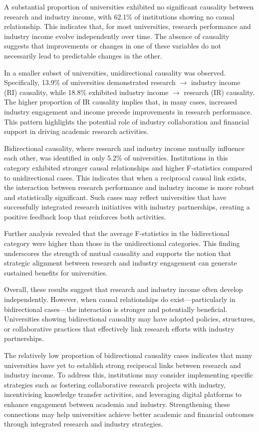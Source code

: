 \documentclass[a4paper, conference]{IEEEtran}
\begin{document}
A substantial proportion of universities exhibited no significant causality between research and industry income, with 62.1\% of institutions showing no causal relationship. This indicates that, for most universities, research performance and industry income evolve independently over time. The absence of causality suggests that improvements or changes in one of these variables do not necessarily lead to predictable changes in the other.

In a smaller subset of universities, unidirectional causality was observed. Specifically, 13.9\% of universities demonstrated research $\rightarrow$ industry income (RI) causality, while 18.8\% exhibited industry income $\rightarrow$ research (IR) causality. The higher proportion of IR causality implies that, in many cases, increased industry engagement and income precede improvements in research performance. This pattern highlights the potential role of industry collaboration and financial support in driving academic research activities.

Bidirectional causality, where research and industry income mutually influence each other, was identified in only 5.2\% of universities. Institutions in this category exhibited stronger causal relationships and higher F-statistics compared to unidirectional cases. This indicates that when a reciprocal causal link exists, the interaction between research performance and industry income is more robust and statistically significant. Such cases may reflect universities that have successfully integrated research initiatives with industry partnerships, creating a positive feedback loop that reinforces both activities.

Further analysis revealed that the average F-statistics in the bidirectional category were higher than those in the unidirectional categories. This finding underscores the strength of mutual causality and supports the notion that strategic alignment between research and industry engagement can generate sustained benefits for universities.

Overall, these results suggest that research and industry income often develop independently. However, when causal relationships do exist—particularly in bidirectional cases—the interaction is stronger and potentially beneficial. Universities showing bidirectional causality may have adopted policies, structures, or collaborative practices that effectively link research efforts with industry partnerships.

The relatively low proportion of bidirectional causality cases indicates that many universities have yet to establish strong reciprocal links between research and industry income. To address this, institutions may consider implementing specific strategies such as fostering collaborative research projects with industry, incentivising knowledge transfer activities, and leveraging digital platforms to enhance engagement between academia and industry. Strengthening these connections may help universities achieve better academic and financial outcomes through integrated research and industry strategies.
\end{document}
